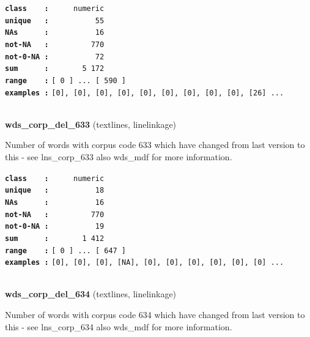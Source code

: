 \documentclass[]{article}
\begin{document}
\textbf{\texttt{class\ \ \ \ :}} \texttt{~~~~~numeric}\\
\textbf{\texttt{unique\ \ \ :}} \texttt{~~~~~~~~~~55}\\
\textbf{\texttt{NAs\ \ \ \ \ \ :}} \texttt{~~~~~~~~~~16}\\
\textbf{\texttt{not-NA\ \ \ :}} \texttt{~~~~~~~~~770}\\
\textbf{\texttt{not-0-NA\ :}} \texttt{~~~~~~~~~~72}\\
\textbf{\texttt{sum\ \ \ \ \ \ :}} \texttt{~~~~~~~5~172}\\
\textbf{\texttt{range\ \ \ \ :}}
\texttt{{[}\ 0\ {]}\ ...\ {[}\ 590\ {]}}\\
\textbf{\texttt{examples\ :}}
\texttt{{[}0{]},\ {[}0{]},\ {[}0{]},\ {[}0{]},\ {[}0{]},\ {[}0{]},\ {[}0{]},\ {[}0{]},\ {[}0{]},\ {[}26{]}\ ...}\\

~

\textbf{wds\_corp\_del\_633} (textlines, linelinkage)

Number of words with corpus code 633 which have changed from last
version to this - see lns\_corp\_633 also wds\_mdf for more information.

\textbf{\texttt{class\ \ \ \ :}} \texttt{~~~~~numeric}\\
\textbf{\texttt{unique\ \ \ :}} \texttt{~~~~~~~~~~18}\\
\textbf{\texttt{NAs\ \ \ \ \ \ :}} \texttt{~~~~~~~~~~16}\\
\textbf{\texttt{not-NA\ \ \ :}} \texttt{~~~~~~~~~770}\\
\textbf{\texttt{not-0-NA\ :}} \texttt{~~~~~~~~~~19}\\
\textbf{\texttt{sum\ \ \ \ \ \ :}} \texttt{~~~~~~~1~412}\\
\textbf{\texttt{range\ \ \ \ :}}
\texttt{{[}\ 0\ {]}\ ...\ {[}\ 647\ {]}}\\
\textbf{\texttt{examples\ :}}
\texttt{{[}0{]},\ {[}0{]},\ {[}0{]},\ {[}NA{]},\ {[}0{]},\ {[}0{]},\ {[}0{]},\ {[}0{]},\ {[}0{]},\ {[}0{]}\ ...}\\

~

\textbf{wds\_corp\_del\_634} (textlines, linelinkage)

Number of words with corpus code 634 which have changed from last
version to this - see lns\_corp\_634 also wds\_mdf for more information.
\end{document}
